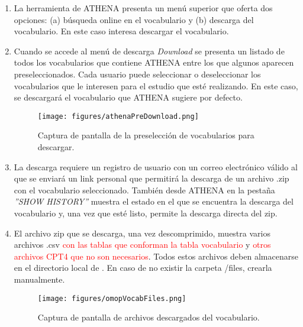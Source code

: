 \begin{enumerate}

    \item La herramienta de ATHENA presenta un menú superior que oferta dos opciones: (a) búsqueda online en el vocabulario y (b) descarga del vocabulario. En este caso interesa descargar el vocabulario.

    \item Cuando se accede al menú de descarga \textit{Download} se presenta un listado de todos los vocabularios que contiene ATHENA entre los que algunos aparecen preseleccionados. Cada usuario puede seleccionar o deseleccionar los vocabularios que le interesen para el estudio que esté realizando. En este caso, se descargará el vocabulario que ATHENA sugiere por defecto.

    \begin{figure}[H]
        \centering
        \texttt{[image: figures/athenaPreDownload.png]}
        \caption{Captura de pantalla de la preselección de vocabularios para descargar.}
        \label{fig:athenaPreDownload}
    \end{figure}

    \item La descarga requiere un registro de usuario con un correo electrónico válido al que se enviará un link personal que permitirá la descarga de un archivo .zip con el vocabulario seleccionado. También desde ATHENA en la pestaña \textit{''SHOW HISTORY''} muestra el estado en el que se encuentra la descarga del vocabulario y, una vez que esté listo, permite la descarga directa del zip.

    \item El archivo zip que se descarga, una vez descomprimido, muestra varios archivos .csv \textcolor{red}{con las tablas que conforman la tabla vocabulario} y \textcolor{red}{otros archivos CPT4 que no son necesarios}. Todos estos archivos deben almacenarse en el directorio local de . En caso de no existir la carpeta \code{}/files, crearla manualmente. 

      \begin{figure}[H]
        \centering
        \texttt{[image: figures/omopVocabFiles.png]}
        \caption{Captura de pantalla de archivos descargados del vocabulario.}
        \label{fig:omopVocabFiles}
    \end{figure}

    
\end{enumerate}

